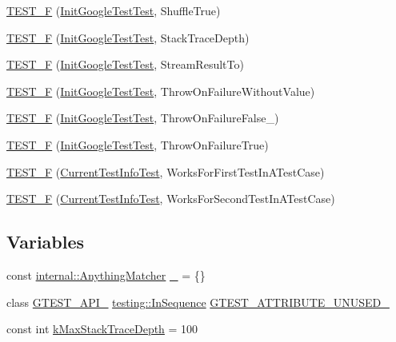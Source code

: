 \begin{DoxyCompactItemize}
\hyperlink{namespacetesting_a24bb2b3783b9e0c419db7f974b641cd4}{T\+E\+S\+T\+\_\+F} (\hyperlink{classtesting_1_1_init_google_test_test}{Init\+Google\+Test\+Test}, Shuffle\+True)
\item 
\hyperlink{namespacetesting_af8579f8ad3383827814d1fbea4fdeee9}{T\+E\+S\+T\+\_\+F} (\hyperlink{classtesting_1_1_init_google_test_test}{Init\+Google\+Test\+Test}, Stack\+Trace\+Depth)
\item 
\hyperlink{namespacetesting_ad9cf0c452b4d2645b037725957021c6c}{T\+E\+S\+T\+\_\+F} (\hyperlink{classtesting_1_1_init_google_test_test}{Init\+Google\+Test\+Test}, Stream\+Result\+To)
\item 
\hyperlink{namespacetesting_a2824800277b4a1e8732abd5d7c2349d1}{T\+E\+S\+T\+\_\+F} (\hyperlink{classtesting_1_1_init_google_test_test}{Init\+Google\+Test\+Test}, Throw\+On\+Failure\+Without\+Value)
\item 
\hyperlink{namespacetesting_adfcdbd6b2715fddd03a47a822517ddea}{T\+E\+S\+T\+\_\+F} (\hyperlink{classtesting_1_1_init_google_test_test}{Init\+Google\+Test\+Test}, Throw\+On\+Failure\+False\+\_)
\item 
\hyperlink{namespacetesting_ad7513c23ff21a4d2761cadfd2afe87e1}{T\+E\+S\+T\+\_\+F} (\hyperlink{classtesting_1_1_init_google_test_test}{Init\+Google\+Test\+Test}, Throw\+On\+Failure\+True)
\item 
\hyperlink{namespacetesting_a1e55a3ca18d877e1e83ce0ed9e7b5c79}{T\+E\+S\+T\+\_\+F} (\hyperlink{classtesting_1_1_current_test_info_test}{Current\+Test\+Info\+Test}, Works\+For\+First\+Test\+In\+A\+Test\+Case)
\item 
\hyperlink{namespacetesting_a3775bdbb5d24619425c52103e7ae6434}{T\+E\+S\+T\+\_\+F} (\hyperlink{classtesting_1_1_current_test_info_test}{Current\+Test\+Info\+Test}, Works\+For\+Second\+Test\+In\+A\+Test\+Case)
\end{DoxyCompactItemize}
\subsection*{Variables}
\begin{DoxyCompactItemize}
\item 
const \hyperlink{classtesting_1_1internal_1_1_anything_matcher}{internal\+::\+Anything\+Matcher} \hyperlink{namespacetesting_a4ba77a3f5b67166ff1b59d96a32346a2}{\+\_\+} = \{\}
\item 
class \hyperlink{gtest-port_8h_aa73be6f0ba4a7456180a94904ce17790}{G\+T\+E\+S\+T\+\_\+\+A\+P\+I\+\_\+} \hyperlink{classtesting_1_1_in_sequence}{testing\+::\+In\+Sequence} \hyperlink{namespacetesting_ae028f80705ba0f84ce7d036bf3793448}{G\+T\+E\+S\+T\+\_\+\+A\+T\+T\+R\+I\+B\+U\+T\+E\+\_\+\+U\+N\+U\+S\+E\+D\+\_\+}
\item 
const int \hyperlink{namespacetesting_ae605f2ccac04616bb7812ca72e517082}{k\+Max\+Stack\+Trace\+Depth} = 100
\end{DoxyCompactItemize}


